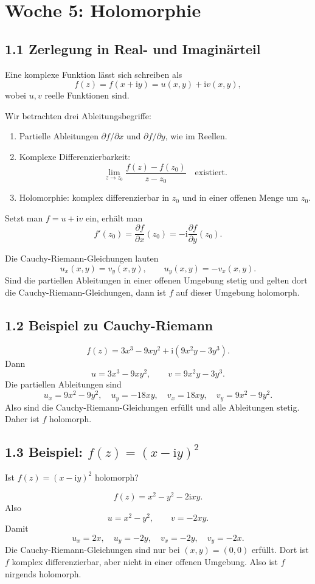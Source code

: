 \documentclass[11pt,a4paper]{article}
\newcommand{\ii}{\mathrm i}
\begin{document}
\section{Woche 5: Holomorphie}

\subsection{1.1 Zerlegung in Real- und Imaginärteil}
Eine komplexe Funktion lässt sich schreiben als
\[
f(z)=f(x+\ii y)=u(x,y)+\ii v(x,y),
\]
wobei $u,v$ reelle Funktionen sind.

Wir betrachten drei Ableitungsbegriffe:
\begin{enumerate}[label=\Roman*.]
\item Partielle Ableitungen $\partial f/\partial x$ und $\partial f/\partial y$, wie im Reellen.
\item Komplexe Differenzierbarkeit:
\[
\lim_{z\to z_0}\frac{f(z)-f(z_0)}{z-z_0}\quad\text{existiert}.
\]
\item Holomorphie: komplex differenzierbar in $z_0$ und in einer offenen Menge um $z_0$.
\end{enumerate}

Setzt man $f=u+\ii v$ ein, erhält man
\[
f'(z_0)=\frac{\partial f}{\partial x}(z_0)=-\ii\frac{\partial f}{\partial y}(z_0).
\]

\begin{importantbox}
Die Cauchy-Riemann-Gleichungen lauten
\[
u_x(x,y)=v_y(x,y),\qquad u_y(x,y)=-v_x(x,y).
\]
Sind die partiellen Ableitungen in einer offenen Umgebung stetig und gelten dort die Cauchy-Riemann-Gleichungen, dann ist $f$ auf dieser Umgebung holomorph.
\end{importantbox}

\subsection{1.2 Beispiel zu Cauchy-Riemann}
\begin{beispielbox}
\[
f(z)=3x^3-9xy^2+\ii(9x^2y-3y^3).
\]
Dann
\[
u=3x^3-9xy^2,
\qquad
v=9x^2y-3y^3.
\]
Die partiellen Ableitungen sind
\[
u_x=9x^2-9y^2,
\quad u_y=-18xy,
\quad v_x=18xy,
\quad v_y=9x^2-9y^2.
\]
Also sind die Cauchy-Riemann-Gleichungen erfüllt und alle Ableitungen stetig. Daher ist $f$ holomorph.
\end{beispielbox}

\subsection{1.3 Beispiel: $f(z)=(x-\ii y)^2$}
\begin{fragebox}
Ist $f(z)=(x-\ii y)^2$ holomorph?
\end{fragebox}
\begin{antwortbox}
\[
f(z)=x^2-y^2-2\ii xy.
\]
Also
\[
u=x^2-y^2,
\qquad v=-2xy.
\]
Damit
\[
u_x=2x,
\quad u_y=-2y,
\quad v_x=-2y,
\quad v_y=-2x.
\]
Die Cauchy-Riemann-Gleichungen sind nur bei $(x,y)=(0,0)$ erfüllt. Dort ist $f$ komplex differenzierbar, aber nicht in einer offenen Umgebung. Also ist $f$ nirgends holomorph.
\end{antwortbox}
\end{document}
